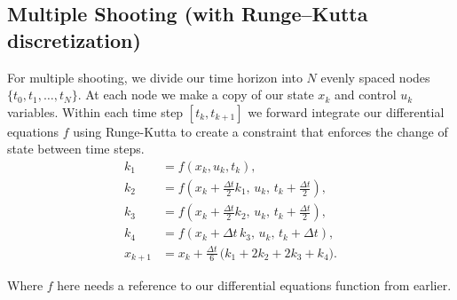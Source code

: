 \documentclass[]{article}
\begin{document}
\subsection*{Multiple Shooting (with Runge–Kutta discretization)}
For multiple shooting, we divide our time horizon into $N$ evenly spaced nodes $\{ t_0, t_1, \ldots, t_N \}$. At each node we make a copy of our state $x_k$ and control $u_k$ variables.  Within each time step $[ t_k, t_{k+1}]$ we forward integrate our differential equations $f$ using Runge-Kutta  to create a constraint that enforces the change of state between time steps. 
\begin{eqnarray}
		 \nonumber
        k_1 &= f(x_k, u_k, t_k), \\[6pt] \nonumber
        k_2 &= f\!\left(x_k + \tfrac{\Delta t}{2} k_1,\, u_k,\, t_k + \tfrac{\Delta t}{2}\right), \\[6pt]  \nonumber
        k_3 &= f\!\left(x_k + \tfrac{\Delta t}{2} k_2,\, u_k,\, t_k + \tfrac{\Delta t}{2}\right), \\[6pt]  \nonumber
        k_4 &= f\!\left(x_k + \Delta t\, k_3,\, u_k,\, t_k + \Delta t\right), \\[10pt]  
        x_{k+1} &= x_k + \tfrac{\Delta t}{6}\,\Big(k_1 + 2k_2 + 2k_3 + k_4\Big).  \label{eq.rkstate}
 \end{eqnarray}
 
 Where $f$ here needs a reference to our differential equations function from earlier.
 
\end{document}
